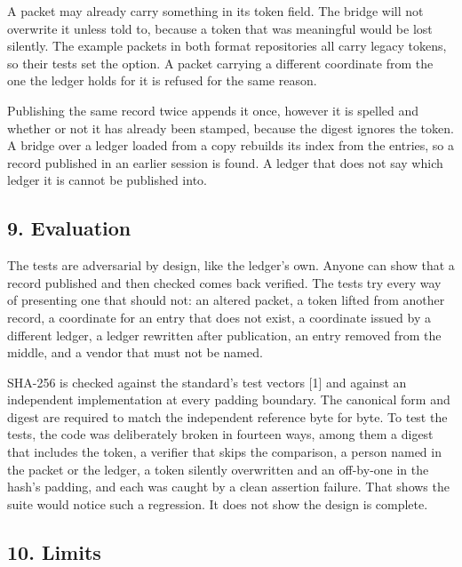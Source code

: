 \documentclass[
  12pt,
  letterpaper,
]{article}
\begin{document}
A packet may already carry something in its token field. The bridge will
not overwrite it unless told to, because a token that was meaningful
would be lost silently. The example packets in both format repositories
all carry legacy tokens, so their tests set the option. A packet
carrying a different coordinate from the one the ledger holds for it is
refused for the same reason.

Publishing the same record twice appends it once, however it is spelled
and whether or not it has already been stamped, because the digest
ignores the token. A bridge over a ledger loaded from a copy rebuilds
its index from the entries, so a record published in an earlier session
is found. A ledger that does not say which ledger it is cannot be
published into.

\hypertarget{evaluation}{%
\subsection{9. Evaluation}\label{evaluation}}

The tests are adversarial by design, like the ledger's own. Anyone can
show that a record published and then checked comes back verified. The
tests try every way of presenting one that should not: an altered
packet, a token lifted from another record, a coordinate for an entry
that does not exist, a coordinate issued by a different ledger, a ledger
rewritten after publication, an entry removed from the middle, and a
vendor that must not be named.

SHA-256 is checked against the standard's test vectors {[}1{]} and
against an independent implementation at every padding boundary. The
canonical form and digest are required to match the independent
reference byte for byte. To test the tests, the code was deliberately
broken in fourteen ways, among them a digest that includes the token, a
verifier that skips the comparison, a person named in the packet or the
ledger, a token silently overwritten and an off-by-one in the hash's
padding, and each was caught by a clean assertion failure. That shows
the suite would notice such a regression. It does not show the design is
complete.

\hypertarget{limits}{%
\subsection{10. Limits}\label{limits}}
\end{document}
